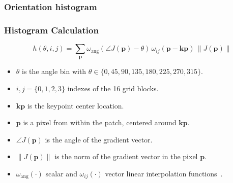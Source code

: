 \documentclass[aspectratio=169]{beamer}
\begin{document}
\begin{frame}
\frametitle{Orientation histogram}
\begin{center}
\begin{figure}[h!]
\centering
\setlength\fboxsep{0pt}
\setlength\fboxrule{0.5pt}
\label{fig:sampledescriptor}
\end{figure}
\end{center}
\end{frame}

\begin{frame}
\frametitle{Histogram Calculation}
\begin{center}

\begin{equation}
 h(\theta,i,j) = \sum_{\mathbf{p}} \omega_\mathrm{ang}(\angle J(\mathbf{p}) - \theta)\, \omega_{ij}\left(\mathbf{p} - \mathbf{kp} \right)\, \left\lVert J(\mathbf{p})\right\rVert 
\label{eq:histogram}
\end{equation}

\begin{itemize}
\item $\theta$ is the angle bin with $ \theta \in \{0, 45, 90, 135, 180, 225, 270, 315\} $.
\item $ i,j = \{0,1,2,3\} $ indexes of the 16 grid blocks.
\item $\mathbf{kp}$ is the keypoint center location.
\item $\mathbf{p}$ is a pixel from within the patch, centered around $\mathbf{kp}$.
\item $\angle J(\mathbf{p}) $ is the angle of the gradient vector.
\item $ \left\lVert J(\mathbf{p}) \right\rVert $ is the norm of the gradient vector in the pixel $\mathbf{p}$.
\item $\omega_\mathrm{ang}(\cdot) $ scalar and $ \omega_{ij}(\cdot) $ vector linear interpolation functions~.
\end{itemize}

\end{center}
\end{frame}
\end{document}
